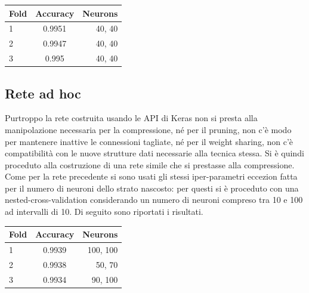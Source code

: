 \documentclass[12pt]{report}
\begin{document}
\begin{center}
\begin{tabular}{lcr}
\toprule
Fold & Accuracy & Neurons \\
\midrule
1  & 0.9951 & 40, 40\\
2  & 0.9947 & 40, 40\\
3  & 0.995 & 40, 40\\
\bottomrule
\end{tabular}
\end{center}

\par\null\par
\par\null\par

\subsection{Rete ad hoc}
Purtroppo la rete costruita usando le API di Keras non si presta alla manipolazione necessaria per la compressione, né per il pruning, non c’è modo per mantenere inattive le connessioni tagliate, né per il weight sharing, non c’è compatibilità con le nuove strutture dati necessarie alla tecnica stessa.
Si è quindi proceduto alla costruzione di una rete simile che si prestasse alla compressione. Come per la rete precedente si sono usati gli stessi iper-parametri eccezion fatta per il numero di neuroni dello strato nascosto: per questi si è proceduto con una nested-cross-validation considerando un numero di neuroni compreso tra 10 e 100 ad intervalli di 10. 
Di seguito sono riportati i risultati.

\par\null\par

\begin{center}
\begin{tabular}{lcr}
\toprule
Fold & Accuracy & Neurons \\
\midrule
1  & 0.9939 & 100, 100\\
2  & 0.9938 & 50, 70\\
3  & 0.9934 & 90, 100\\
\bottomrule
\end{tabular}
\end{center}
\end{document}
